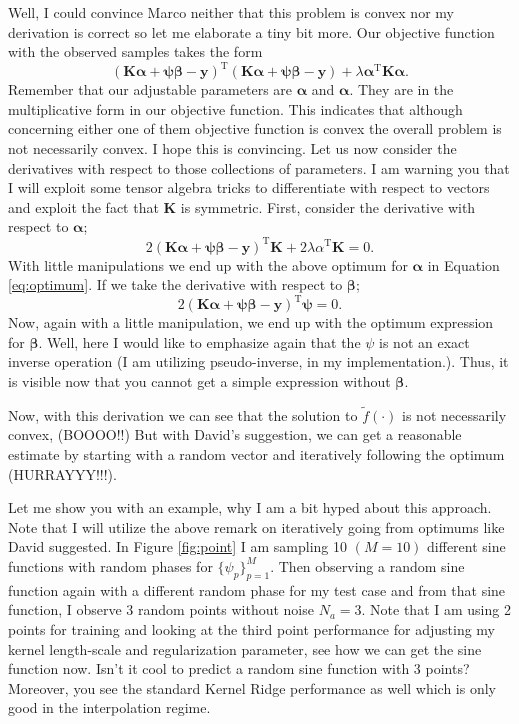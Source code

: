 \documentclass{tran-l}
\theoremstyle{definition}
\theoremstyle{remark}
\numberwithin{equation}{section}
\begin{document}
\rem Well, I could convince Marco neither that this problem is convex nor my derivation is correct so let me elaborate a tiny bit more. Our objective function with the observed samples takes the form
\begin{equation}
  (\mathbf{K}\boldsymbol{\alpha}+\boldsymbol{\psi\beta}-\mathbf{y})^\text{T}(\mathbf{K}\boldsymbol{\alpha}+\boldsymbol{\psi\beta}-\mathbf{y}) + \lambda\boldsymbol{\alpha}^\text{T}\mathbf{K}\boldsymbol{\alpha}.
\end{equation}
Remember that our adjustable parameters are $\boldsymbol{\alpha}$ and $\boldsymbol{\alpha}$. They are in the multiplicative form in our objective function. This indicates that although concerning either one of them objective function is convex the overall problem is not necessarily convex. I hope this is convincing. Let us now consider the derivatives with respect to those collections of parameters. I am warning you that I will exploit some tensor algebra tricks to differentiate with respect to vectors and exploit the fact that $\mathbf{K}$ is symmetric. First, consider the derivative with respect to $\boldsymbol{\alpha}$;
\begin{equation}
  2(\mathbf{K}\boldsymbol{\alpha}+\boldsymbol{\psi\beta}-\mathbf{y})^\text{T}\mathbf{K}+2\lambda\alpha^\text{T}\mathbf{K}=0.
\end{equation}
With little manipulations we end up with the above optimum for $\boldsymbol{\alpha}$ in Equation \ref{eq:optimum}. If we take the derivative with respect to $\boldsymbol{\beta}$;
\begin{equation}
  2(\mathbf{K}\boldsymbol{\alpha}+\boldsymbol{\psi\beta}-\mathbf{y})^\text{T}\boldsymbol{\psi}=0.
\end{equation}
Now, again with a little manipulation, we end up with the optimum expression for $\boldsymbol{\beta}$. Well, here I would like to emphasize again that the $\psi$ is not an exact inverse operation (I am utilizing pseudo-inverse, in my implementation.). Thus, it is visible now that you cannot get a simple expression without $\boldsymbol{\beta}$. 


\rem Now, with this derivation we  can see that the solution to $\tilde{f}(\cdot)$ is not necessarily convex, (BOOOO!!) But with David's suggestion, we can get a reasonable estimate by starting with a random vector and iteratively following the optimum (HURRAYYY!!!). 

Let me show you with an example, why I am a bit hyped about this approach. Note that I will utilize the above remark on iteratively going from optimums like David suggested. In Figure \ref{fig:point} I am sampling 10 $(M=10)$ different sine functions with random phases for $\{\psi_p\}_{p=1}^M$. Then observing a random sine function again with a different random phase for my test case and from that sine function, I observe 3 random points without noise $N_a=3$. Note that I am using 2 points for training and looking at the third point performance for adjusting my kernel length-scale and regularization parameter, see how we can get the sine function now. Isn't it cool to predict a random sine function with 3 points? Moreover, you see the standard Kernel Ridge performance as well which is only good in the interpolation regime.
\end{document}
